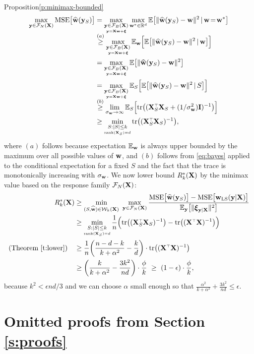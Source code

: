 \documentclass[12pt]{sty/colt2019/colt2018-arxiv}
\begin{document}
\begin{proofof}{Proposition}{\ref{p:minimax-bounded}}
\begin{align*}
  \max_{\y\in\Fc_N(\X)}\MSE{\wbh(\y_S)}
  &= \max_{\underset{\y=\X\w+\xib}{\y\in\Fc_B(\X)}}
\max_{\w^*\in\R^d}\E\big[\|\wbh(\y_S)-\w\|^2\,|\,\w\!=\!\w^*\big]\\[-2mm]
    &\overset{(a)}{\geq} \max_{\underset{\y=\X\w+\xib}{\y\in\Fc_B(\X)}}\E_\w\Big[\E\big[\|\wbh(\y_S)-\w\|^2\,|\,\w\big]\Big]\\
    &= \max_{\underset{\y=\X\w+\xib}{\y\in\Fc_B(\X)}} \E\big[\|\wbh(\y_S)-\w\|^2\big]\\
  &=\max_{\underset{\y=\X\w+\xib}{\y\in\Fc_B(\X)}}\E_S\Big[\E\big[\|\wbh(\y_S)-\w\|^2\,|\,S\big]\Big]\\[-2mm]
  &\overset{(b)}{\geq} \lim_{\sigma_\w\rightarrow\infty}
    \E_S\Big[\tr\big((\X_S^\top\X_S+(1/\sigma_\w^2)\I)^{-1}\big)\Big]\\
  &%
 \geq \min_{\underset{\rank(\X_S)=d}{S:|S|\leq k}}\tr\big((\X_S^\top\X_S)^{-1}\big),
\end{align*}
where $(a)$ follows because expectation $\mathbb E_\mathbf w$ is always upper
bounded by the maximum over all possible values of $\mathbf w$, and $(b)$
follows from \eqref{eq:bayes} applied to the conditional expectation
for a fixed $S$ and the fact that the trace is monotonically increasing with $\sigma_\mathbf w$.
We now lower bound $R_k^*(\mathbf X)$ by the minimax value based on the
response family $\mathcal{F}_N(\mathbf X)$: 
  \begin{align*}
    R_k^*(\X)
    &\geq
\min_{(S,\wbh)\in\Wc_k(\X)}\
      \max_{\y\in\Fc_N(\X)}\frac{\MSE{\wbh(\y_S)}-
      \MSE{\wols(\y|\X)}}{\E_\y\big[\|\xib_{\y|\X}\|^2\big]}\\
   &\geq\min_{\underset{\rank(\X_S)=d}{S:|S|\leq k}}\frac1n\Big(\tr\big((\X_S^\top\X_S)^{-1}\big)-\tr\big((\X^\top\X)^{-1}\big)\Big)\\ 
    \text{(Theorem \ref{t:lower})}\quad&\geq
\frac1n\bigg(\frac{n-d-k}{k+\alpha^2}-\frac kd\bigg)\cdot
                                         \tr\big((\X^\top\X)^{-1}\big)\\
&    \geq  \bigg(\frac k{k+\alpha^2} - \frac{3k^2}{nd}\bigg)\cdot
      \frac\phi k\ \geq\  (1-\epsilon)\cdot\frac\phi k,
  \end{align*}
because $k^2<\epsilon nd/3$ and we can choose $\alpha$ small enough
so that $\frac{\alpha^2}{k+\alpha^2}+\frac{3k^2}{nd} \leq \epsilon$.
\end{proofof}




\section{Omitted proofs from Section \ref{s:proofs}}
\label{a:mult}
\end{document}
